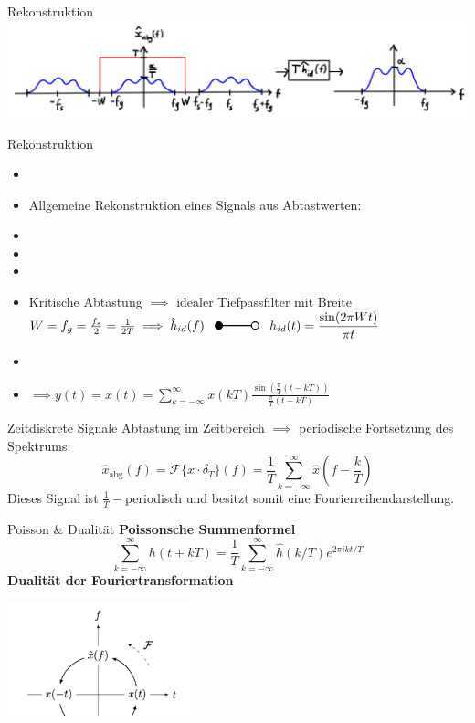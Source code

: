 \documentclass[14pt, aspectratio=169, handout]{beamer}
\newcommand{\invtransform}[2]{%
    \begin{tikzpicture}
        \filldraw[thick] (0,0) circle (0.1);
        \draw[thick] (0.1,0) -- (#2 -0.1,0) node[midway, above] {#1};
        \draw[thick] (#2,0) circle (0.1);
    \end{tikzpicture}%
}
\begin{document}
\begin{frame}{Rekonstruktion}
    \includegraphics[width=\linewidth]{figures/filtering1.jpg}
\end{frame}


\begin{frame}{Rekonstruktion}
\vspace*{-0.5cm}
    \begin{itemize}
    \item[] 
    \item Allgemeine Rekonstruktion eines Signals aus Abtastwerten:
    \item[] 
    \item[] 
    \item[] 
    \item Kritische Abtastung $\implies$ idealer Tiefpassfilter mit Breite $W = f_g = \frac{f_s}{2} = \frac{1}{2T} \implies \hat{h}_{id}(f) \hspace{8pt}\invtransform{}{1} \hspace{8pt} h_{id}(t)=\displaystyle\frac{\sin(2 \pi W t)}{\pi t}$
    \item[] 
    \item[] $\implies y(t) = x(t) = \displaystyle\sum_{k=-\infty}^\infty x(kT)\displaystyle\frac{\sin\left(\frac{\pi}{T}(t-kT)\right)}{\frac{\pi}{T}(t-kT)}$
\end{itemize}
\end{frame}

\begin{frame}{Zeitdiskrete Signale}
    Abtastung im Zeitbereich $\implies$ periodische Fortsetzung des Spektrums:
$$\hat{x}_{\text{abg}}(f) = \mathcal{F}\{x \cdot \delta_T\}(f) = \frac{1}{T}\sum_{k=-\infty}^{\infty}\hat{x}\left( f- \frac{k}{T} \right)$$
Dieses Signal ist $\frac{1}{T}-$periodisch und besitzt somit eine Fourierreihendarstellung.
\end{frame}

\begin{frame}{Poisson \& Dualität}
    \textbf{Poissonsche Summenformel}
    $$\sum_{k=-\infty}^\infty h(t + kT) = \frac{1}{T} \sum_{k=-\infty}^\infty \hat{h}(k/T)e^{2 \pi i k t/T}$$
    \textbf{Dualität der Fouriertransformation}
    \begin{center}
        \includegraphics[width=0.4\textwidth]{figures/dualitaet_1.png}
    \end{center}
\end{frame}
\end{document}
